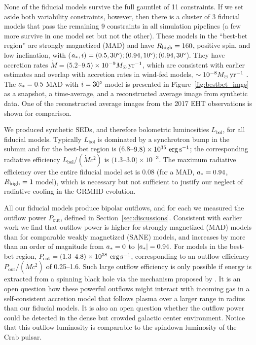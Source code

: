 None of the fiducial models survive the full gauntlet of 11 constraints.
If we set aside both variability constraints, however, then there is a cluster of 3 fiducial models that pass the remaining 9 constraints in all simulation pipelines (a few more survive in one model set but not the other).
These models in the ``best-bet region'' are strongly magnetized (MAD) and have $R_\mathrm{high} = 160$, positive spin, and low inclination, with ($\abh, i) = (0.5, 30\degree); (0.94, 10\degree); (0.94, 30\degree$).
They have accretion rates $\dot{M} = (5.2$--$9.5)\times 10^{-9}M_\odot\,\mathrm{yr}^{-1}$, which are consistent with earlier estimates and overlap with accretion rates in wind-fed models, $\sim 10^{-8} M_\odot\,\mathrm{yr}^{-1}$ \citep{2020ApJ...896L...6R}.
The $a_* = 0.5$ MAD with $i=30\degree$ model is presented in Figure~\ref{fig:bestbet_imgs} as a snapshot, a time-average, and a reconstructed average image from synthetic data.  One of the reconstructed average images from the 2017 EHT observations is shown for comparison. 

We produced synthetic SEDs, and therefore bolometric luminosities $L_\mathrm{bol}$, for all fiducial models.
Typically $L_\mathrm{bol}$ is dominated by a synchrotron bump in the submm and for the best-bet region is $(6.8$--$9.8)\times10^{35}\,\,\mathrm{erg}\,\mathrm{s}^{-1}$; the corresponding radiative efficiency $L_\mathrm{bol}/(\dot{M} c^2)$ is $(1.3$--$3.0)\times 10^{-3}$.
The maximum radiative efficiency over the entire fiducial model set is 0.08 (for a MAD, $a_* = 0.94$, $R_\mathrm{high} = 1$ model), which is necessary but not sufficient to justify our neglect of radiative cooling in the GRMHD evolution.

All our fiducial models produce bipolar outflows, and for each we measured the outflow power $P_\mathrm{out}$, defined in Section~\ref{sec:discussions}.
Consistent with earlier work we find that outflow power is higher for strongly magnetized (MAD) models than for comparable weakly magnetized (SANE) models, and increases by more than an order of magnitude from $a_* = 0$ to $|a_*| = 0.94$.
For models in the best-bet region, $P_\mathrm{out} = (1.3$--$4.8) \times 10^{38}\,\,\mathrm{erg}\,\mathrm{s}^{-1}$, corresponding to an outflow efficiency $P_\mathrm{out} /(\dot{M} c^2)$ of 0.25--1.6.
Such large outflow efficiency is only possible if energy is extracted from a spinning black hole via the mechanism proposed by  \cite{1977MNRAS.179..433B}.
It is an open question how these powerful outflows might interact with incoming gas in a self-consistent accretion model that follows plasma over a larger range in radius than our fiducial models.
It is also an open question whether the outflow power could be detected in the dense but crowded galactic center environment.
Notice that this outflow luminosity is comparable to the spindown luminosity of the Crab pulsar.

